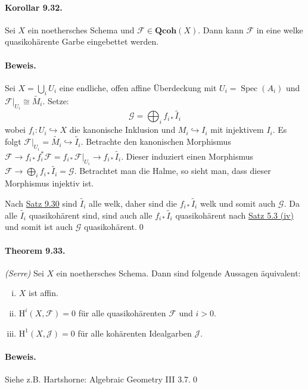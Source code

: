 \paragraph{Korollar 9.32.}\label{9.32} Sei $X$ ein noethersches Schema und $\mathcal{F}\in\mathbf{Qcoh}(X)$. Dann kann $\mathcal{F}$ in eine welke quasikohärente Garbe eingebettet werden.

\paragraph{Beweis.} Sei $X=\bigcup_i U_i$ eine endliche, offen affine Überdeckung mit $U_i=\operatorname{Spec}(A_i)$ und $\mathcal{F}|_{U_i}\cong\widetilde{M_i}$. Setze:
\[\mathcal{G} =\bigoplus_i f_{i\ast}\widetilde{I_i} \]
wobei $f_i:U_i\hookrightarrow X$ die kanonische Inklusion und $M_i\hookrightarrow I_i$ mit injektivem $I_i$. Es folgt $\mathcal{F}|_{U_i}=\widetilde{M_i} \hookrightarrow\widetilde{I_i}$. Betrachte den kanonischen Morphismus $\mathcal{F}\to f_{i\ast}f_i^\ast\mathcal{F}=f_{i\ast}\mathcal{F}|_{U_i}\to f_{i\ast}\widetilde{I_i}$. Dieser induziert einen Morphismus $\mathcal{F}\to\bigoplus_i f_{i\ast}\widetilde{I_i}=\mathcal{G}$. Betrachtet man die Halme, so sieht man, dass dieser Morphismus injektiv ist.

Nach \hyperref[9.30]{Satz 9.30} sind $\widetilde{I_i}$ alle welk, daher sind die $f_{i\ast}\widetilde{I_i}$ welk und somit auch $\mathcal{G}$. Da alle $\widetilde{I_i}$ quasikohärent sind, sind auch alle $f_{i\ast}\widetilde{I_i}$ quasikohärent nach \hyperref[5.3]{Satz 5.3 (iv)} und somit ist auch $\mathcal{G}$ quasikohärent.\qed

\paragraph{Theorem 9.33.}\label{9.33} \textit{(Serre)} Sei $X$ ein noethersches Schema. Dann sind folgende Aussagen äquivalent:
\begin{enumerate}[(i)]
\item $X$ ist affin.
\item $\mathrm{H}^i(X,\mathcal{F})=0$ für alle quasikohärenten $\mathcal{F}$ und $i>0$.
\item $\mathrm{H}^1(X,\mathcal{J})=0$ für alle kohärenten Idealgarben $\mathcal{J}$.
\end{enumerate}

\paragraph{Beweis.} Siehe z.B. Hartshorne: Algebraic Geometry III 3.7.\qed

